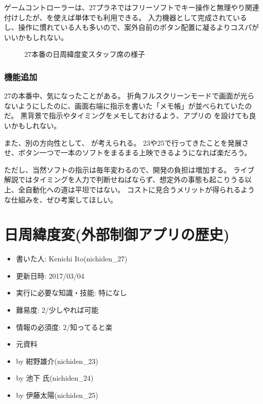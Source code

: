 \documentclass[letterpaper,10pt,dvipdfmx]{sphinxmanual}
\begin{document}
ゲームコントローラーは、27プラネではフリーソフトでキー操作と無理やり関連付けしたが、を使えば単体でも利用できる。
入力機器として完成されているし、操作に慣れている人も多いので、案外自前のボタン配置に凝るよりコスパがいいかもしれない。
\begin{figure}[htbp]
\centering
\capstart

\noindent{}
\caption{27本番の日周緯度変スタッフ席の様子}\label{\detokenize{nissyu-idohen/pc-software:id14}}\end{figure}


\subsection{機能追加}
\label{\detokenize{nissyu-idohen/pc-software:id11}}
27の本番中、気になったことがある。
折角フルスクリーンモードで画面が光らないようにしたのに、画面右端に指示を書いた「メモ帳」が並べられていたのだ。
黒背景で指示やタイミングをメモしておけるよう、アプリの
を設けても良いかもしれない。

また、別の方向性として、 が考えられる。
23や25で行ってきたことを発展させ、ボタン一つで一本のソフトをまるまる上映できるようになれば楽だろう。

ただし、当然ソフトの指示は毎年変わるので、開発の負担は増加する。
ライブ解説ではタイミングを人力で判断せねばならず、想定外の事態も起こりうる以上、全自動化への道は平坦ではない。
コストに見合うメリットが得られるような仕組みを、ぜひ考案してほしい。


\chapter{日周緯度変(外部制御アプリの歴史)}
\label{\detokenize{nissyu-idohen/pc-software-history::doc}}\label{\detokenize{nissyu-idohen/pc-software-history:id1}}\begin{itemize}
\item {} 
書いた人: Kenichi Ito(nichiden\_27)

\item {} 
更新日時: 2017/03/04

\item {} 
実行に必要な知識・技能: 特になし

\item {} 
難易度: 2/少しやれば可能

\item {} 
情報の必須度: 2/知ってると楽

\item {} 
元資料

\item {} 
by 紺野雄介(nichiden\_23)

\item {} 
 by 池下 氏(nichiden\_24)

\item {} 
 by 伊藤太陽(nichiden\_25)

\end{itemize}
\end{document}
